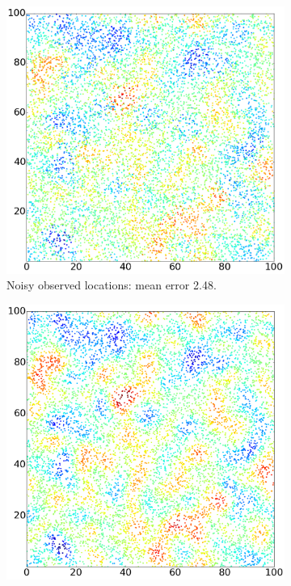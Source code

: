 \documentclass{article}
\begin{document}
\begin{figure}
 \centering
 \begin{subfigure}[t]{.22\textwidth}
         \includegraphics[width=\textwidth]{synth_init_X}
         \caption{Noisy observed locations: mean error 2.48.}
         \label{fig:synthX}
     \end{subfigure}\hspace{0.5em}  
\begin{subfigure}[t]{.21\textwidth}
        \includegraphics[width=\textwidth]{synth_fullgp}

\end{subfigure}
\end{figure}
\end{document}
